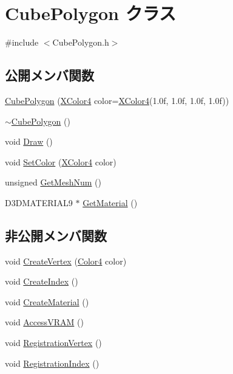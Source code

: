 \hypertarget{class_cube_polygon}{}\section{Cube\+Polygon クラス}
\label{class_cube_polygon}


{\ttfamily \#include $<$Cube\+Polygon.\+h$>$}

\subsection*{公開メンバ関数}
\begin{DoxyCompactItemize}
\item 
\mbox{\hyperlink{class_cube_polygon_aee418cf078227778280dafb22d7586bb}{Cube\+Polygon}} (\mbox{\hyperlink{_vector3_d_8h_a680c30c4a07d86fe763c7e01169cd6cc}{X\+Color4}} color=\mbox{\hyperlink{_vector3_d_8h_a680c30c4a07d86fe763c7e01169cd6cc}{X\+Color4}}(1.\+0f, 1.\+0f, 1.\+0f, 1.\+0f))
\item 
\mbox{\hyperlink{class_cube_polygon_ae6cd078c65ba32e8da56b8f7d5e92d2a}{$\sim$\+Cube\+Polygon}} ()
\item 
void \mbox{\hyperlink{class_cube_polygon_ac9003cd00eea402f2b6c5fb5a77feae2}{Draw}} ()
\item 
void \mbox{\hyperlink{class_cube_polygon_acf6a30c30c22dd887ed570db6cbe285d}{Set\+Color}} (\mbox{\hyperlink{_vector3_d_8h_a680c30c4a07d86fe763c7e01169cd6cc}{X\+Color4}} color)
\item 
unsigned \mbox{\hyperlink{class_cube_polygon_adf0956096c0d5dd31cf5b730dc8ca9c4}{Get\+Mesh\+Num}} ()
\item 
D3\+D\+M\+A\+T\+E\+R\+I\+A\+L9 $\ast$ \mbox{\hyperlink{class_cube_polygon_a6bd49d47a58c9c89a1ddaee37f7f4d22}{Get\+Material}} ()
\end{DoxyCompactItemize}
\subsection*{非公開メンバ関数}
\begin{DoxyCompactItemize}
\item 
void \mbox{\hyperlink{class_cube_polygon_ae36048a1ae7b13b6bc8571231b372627}{Create\+Vertex}} (\mbox{\hyperlink{_vector3_d_8h_a9c2339f516cf07ce4753b8a99fab3791}{Color4}} color)
\item 
void \mbox{\hyperlink{class_cube_polygon_ade2e155c44798710b8e91ac84b02340f}{Create\+Index}} ()
\item 
void \mbox{\hyperlink{class_cube_polygon_abc3b69a3cb237dec28d0bba9229f0b8d}{Create\+Material}} ()
\item 
void \mbox{\hyperlink{class_cube_polygon_a715db255bf7ebd3c3aec2095d73b9399}{Access\+V\+R\+AM}} ()
\item 
void \mbox{\hyperlink{class_cube_polygon_adde345ed591e3e81abcffdcac5068f98}{Registration\+Vertex}} ()
\item 
void \mbox{\hyperlink{class_cube_polygon_a5a935712a3e3c1e12552aeedf2f409c1}{Registration\+Index}} ()
\end{DoxyCompactItemize}
